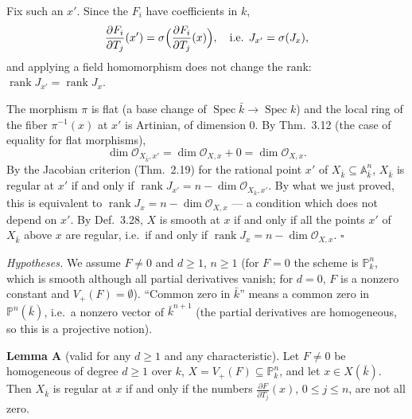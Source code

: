 \documentclass[11pt]{article}
\begin{document}
Fix such an $x'$. Since the $F_i$ have coefficients in $k$,
\[ \frac{\partial F_i}{\partial T_j}(x')=\sigma\Bigl(\frac{\partial F_i}{\partial T_j}(x)\Bigr),\quad\text{i.e. } J_{x'}=\sigma(J_x),\]
and applying a field homomorphism does not change the rank: $\operatorname{rank}J_{x'}=\operatorname{rank}J_x$.

The morphism $\pi$ is flat (a base change of $\operatorname{Spec}\bar k\to\operatorname{Spec}k$) and the local ring of the fiber $\pi^{-1}(x)$ at $x'$ is Artinian, of dimension $0$. By Thm.~3.12 (the case of equality for flat morphisms),
\[ \dim\mathcal O_{X_{\bar k},x'}=\dim\mathcal O_{X,x}+0=\dim\mathcal O_{X,x}. \]
By the Jacobian criterion (Thm.~2.19) for the rational point $x'$ of $X_{\bar k}\subseteq\mathbb A^n_{\bar k}$, $X_{\bar k}$ is regular at $x'$ if and only if $\operatorname{rank}J_{x'}=n-\dim\mathcal O_{X_{\bar k},x'}$. By what we just proved, this is equivalent to $\operatorname{rank}J_x=n-\dim\mathcal O_{X,x}$ --- a condition which does not depend on $x'$. By Def.~3.28, $X$ is smooth at $x$ if and only if all the points $x'$ of $X_{\bar k}$ above $x$ are regular, i.e.\ if and only if $\operatorname{rank}J_x=n-\dim\mathcal O_{X,x}$. \hfill$\square$

\pf
\emph{Hypotheses.} We assume $F\neq0$ and $d\ge1$, $n\ge1$ (for $F=0$ the scheme is $\mathbb P^n_k$, which is smooth although all partial derivatives vanish; for $d=0$, $F$ is a nonzero constant and $V_+(F)=\emptyset$). ``Common zero in $\bar k$'' means a common zero in $\mathbb P^n(\bar k)$, i.e.\ a nonzero vector of $\bar k^{n+1}$ (the partial derivatives are homogeneous, so this is a projective notion).

\textbf{Lemma A} (valid for any $d\ge1$ and any characteristic). Let $F\neq0$ be homogeneous of degree $d\ge1$ over $k$, $X=V_+(F)\subseteq\mathbb P^n_k$, and let $x\in X(\bar k)$. Then $X_{\bar k}$ is regular at $x$ if and only if the numbers $\frac{\partial F}{\partial T_j}(x)$, $0\le j\le n$, are not all zero.
\end{document}
